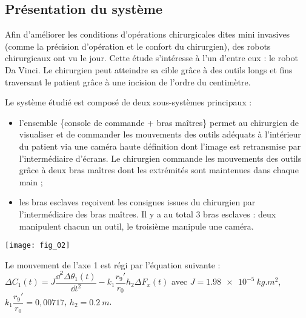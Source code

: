 \normaltrue \difficilefalse \tdifficilefalse
\correctiontrue



\setcounter{question}{0}
\ifcorrection
\else
{}
\fi




\ifprof
\else
\subsection*{Présentation du système}

Afin d’améliorer les conditions d’opérations chirurgicales dites mini invasives (comme la précision d’opération
et le confort du chirurgien), des robots chirurgicaux ont vu le jour. Cette étude s’intéresse à l’un d’entre eux : le
robot Da Vinci. Le chirurgien peut atteindre sa cible grâce à des outils longs et fins traversant le patient grâce
à une incision de l’ordre du centimètre.


Le système étudié est composé de deux sous-systèmes principaux :
\begin{itemize}
\item l’ensemble \{console de commande + bras maîtres\} permet au chirurgien de visualiser et de commander les
mouvements des outils adéquats à l’intérieur du patient via une caméra haute définition dont l’image est
retransmise par l’intermédiaire d’écrans. Le chirurgien commande les mouvements des outils grâce à deux
bras maîtres dont les extrémités sont maintenues dans chaque main ;
\item les bras esclaves reçoivent les consignes issues du chirurgien par l’intermédiaire des bras maîtres. Il y a au
total 3 bras esclaves : deux manipulent chacun un outil, le troisième manipule une caméra.
\end{itemize}
\begin{center}
\texttt{[image: fig\_02]}
\end{center}


Le mouvement de l'axe 1 est régi par l'équation suivante : 
$\Delta C_1(t)=J\dfrac{\dd^2 \Delta \theta_1(t)}{\dd t^2} - k_1 \dfrac{r_9'}{r_0}h_2 \Delta F_x(t)$ avec $J=\SI{1,98e-5}{kg.m^2}$, $k_1\dfrac{r_9'}{r_0}=0,00717$, $h_2=\SI{0,2}{m}$.

